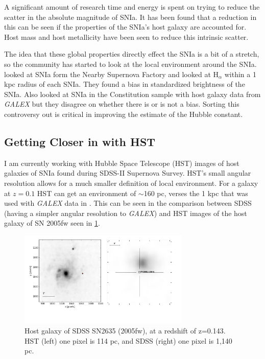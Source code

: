\documentclass[apj, iop]{emulateapj}
\newcommand{\sn}{SNIa}
\begin{document}
A significant amount of research time and energy is spent on trying to reduce
the scatter in the absolute magnitude of \sn{}. It has been found that a
reduction in this can be seen if the properties of the \sn{}'s host galaxy are
accounted for. Host mass \citep{Childress13} and host metallicity
\citep{Hayden13} have been seen to reduce this intrinsic scatter.

The idea that these global properties directly effect the \sn{} is a bit of a
stretch, so the community has started to look at the local environment around
the \sn{}. \cite{Rigault13} looked at \sn{} form the Nearby Supernova Factory
and looked at H$_{\alpha}$ within a 1 kpc radius of each \sn{}. They found  a
bias in standardized brightness of the \sn{}. Also \cite{Rigault15, Jones15}
looked at \sn{} in the Constitution sample with host galaxy data from {\it
GALEX} but they disagree on whether there is or is not a bias. Sorting this
controversy out is critical in improving the estimate of the Hubble constant.

\subsection{Getting Closer in with HST}\label{hst}

I am currently working with Hubble Space Telescope (HST) images of host galaxies
of \sn{} found during SDSS-II Supernova Survey. HST's small angular resolution
allows for a much smaller definition of local environment. For a galaxy at $z =
0.1$ HST can get an environment of $\sim$160 pc, verses the 1 kpc that was used
with {\it GALEX} data in \cite{Jones15,Rigault15}. This can be seen in the
comparison between SDSS (having a simpler angular resolution to {\it GALEX}) and
HST images of the host galaxy of SN 2005fw seen in \cref{f:galaxy-compare}.

\begin{figure}
	\includegraphics[width=3.2in]{SN2635-combined-inverted.pdf}
	\caption{Host galaxy of SDSS SN2635 (2005fw), at a redshift of z=0.143. HST 
	(left) one pixel is 114 pc, and SDSS (right) one pixel is 1,140 pc.}
	\label{f:galaxy-compare}
\end{figure}
\end{document}
